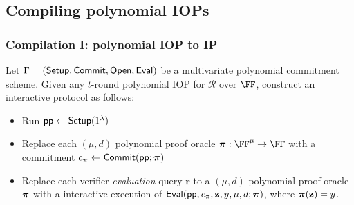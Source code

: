 \subsection{Compiling polynomial IOPs} 
\label{subsec:compiling}


\subsubsection*{Compilation I: polynomial IOP to IP} 
Let $\Gamma = (\textsf{{Setup}}, \textsf{{Commit}}, \textsf{{Open}}, \textsf{{Eval}})$ be a multivariate polynomial commitment scheme. Given any $t$-round polynomial IOP for $\mathcal{R}$ over $\FF$, construct an interactive protocol as follows: 
\begin{itemize}
\item Run $\textsf{pp} \leftarrow \textsf{{Setup}}(1^\lambda)$
\item Replace each $(\mu, d)$ polynomial proof oracle $\proofO: \FF^\mu \rightarrow \FF$ with a commitment $c_{\boldsymbol{\pi}} \leftarrow \textsf{{Commit}}(\textsf{pp}; \boldsymbol{\pi})$ 
\item Replace each verifier \emph{evaluation} query $\mathbf{r}$ to a $(\mu, d)$ polynomial proof oracle $\boldsymbol{\pi}$ with a interactive execution of $\textsf{{Eval}}(\textsf{pp}, c_\pi, \mathbf{z}, y, \mu, d; \boldsymbol{\pi})$, where $\boldsymbol{\pi}(\mathbf{z}) = y$. 
\end{itemize}

